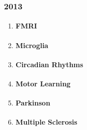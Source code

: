 \documentclass[12pt,article,oneside,a4paper]{memoir}
\begin{document}
\subsubsection{2013}
\begin{enumerate}
\item \paragraph{FMRI}
\item \paragraph{Microglia}
\item \paragraph{Circadian Rhythms}
\item \paragraph{Motor Learning}
\item \paragraph{Parkinson}
\item \paragraph{Multiple Sclerosis}
\end{enumerate}
\end{document}
